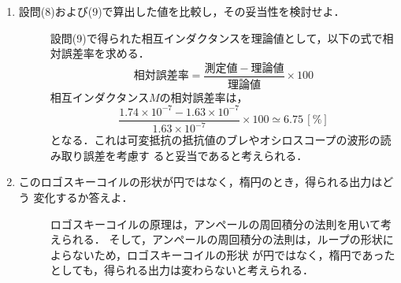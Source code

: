 \begin{enumerate}
    \item 設問(8)および(9)で算出した値を比較し，その妥当性を検討せよ．
    \begin{description}
        \item[] 設問(9)で得られた相互インダクタンスを理論値として，以下の式で相対誤差率を求める．
        $$
        相対誤差率=\frac{測定値-理論値}{理論値}\times 100
        $$
        相互インダクタンス$M$の相対誤差率は，
        $$
        \frac{1.74\times10^{-7}-1.63\times10^{-7}}{1.63\times10^{-7}}\times 100 \simeq 6.75\,[\%]
        $$
        となる．これは可変抵抗の抵抗値のブレやオシロスコープの波形の読み取り誤差を考慮す
        ると妥当であると考えられる．
    \end{description}

    \item このロゴスキーコイルの形状が円ではなく，楕円のとき，得られる出力はどう
    変化するか答えよ．
    \begin{description}
        \item[] ロゴスキーコイルの原理は，アンペールの周回積分の法則を用いて考えられる．
        そして，アンペールの周回積分の法則は，ループの形状によらないため，ロゴスキーコイルの形状
        が円ではなく，楕円であったとしても，得られる出力は変わらないと考えられる．
    \end{description}
\end{enumerate}